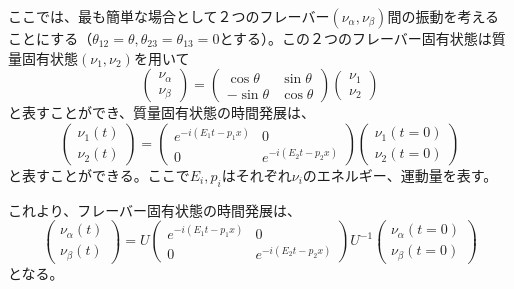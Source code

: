 \documentclass[11pt]{jreport}
\begin{document}
ここでは、最も簡単な場合として２つのフレーバー$(\nu_{\alpha}, \nu_{\beta})$間の振動を考えることにする（$\theta_{12}=\theta, \theta_{23}=\theta_{13}=0$とする）。この２つのフレーバー固有状態は質量固有状態$(\nu_{1}, \nu_{2})$を用いて
\begin{equation}
\begin{pmatrix}
\nu_{\alpha}\\
\nu_{\beta}
\end{pmatrix}
=
\begin{pmatrix}
\cos\theta & \sin\theta\\
-\sin\theta & \cos\theta
\end{pmatrix}
\begin{pmatrix}
\nu_{1}\\
\nu_{2}
\end{pmatrix}
\end{equation}
と表すことができ、質量固有状態の時間発展は、
\begin{equation}
\begin{pmatrix}
\nu_{1}(t)\\
\nu_{2}(t)
\end{pmatrix}
=
\begin{pmatrix}
e^{-i(E_{1}t-p_{1}x)} & 0\\
0 & e^{-i(E_{2}t-p_{2}x)}
\end{pmatrix}
\begin{pmatrix}
\nu_{1}(t=0)\\
\nu_{2}(t=0)
\end{pmatrix}
\end{equation}
と表すことができる。ここで$E_{i}, p_{i}$はそれぞれ$\nu_{i}$のエネルギー、運動量を表す。

これより、フレーバー固有状態の時間発展は、
\begin{equation}
\begin{pmatrix}
\nu_{\alpha}(t)\\
\nu_{\beta}(t)
\end{pmatrix}
=U
\begin{pmatrix}
e^{-i(E_{1}t-p_{1}x)} & 0\\
0 & e^{-i(E_{2}t-p_{2}x)}
\end{pmatrix}
U^{-1}
\begin{pmatrix}
\nu_{\alpha}(t=0)\\
\nu_{\beta}(t=0) \label{equA}
\end{pmatrix}
\end{equation}
となる。
\end{document}
